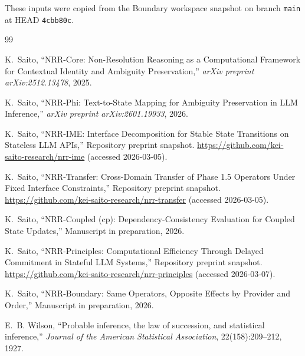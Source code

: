 \documentclass[11pt,a4paper]{article}
\begin{document}
These inputs were copied from the Boundary workspace snapshot on branch \texttt{main} at HEAD \texttt{4cbb80c}.

\begin{thebibliography}{99}
\raggedright

K.~Saito,
\newblock ``NRR-Core: Non-Resolution Reasoning as a Computational Framework for Contextual Identity and Ambiguity Preservation,''
\newblock \emph{arXiv preprint arXiv:2512.13478}, 2025.

K.~Saito,
\newblock ``NRR-Phi: Text-to-State Mapping for Ambiguity Preservation in LLM Inference,''
\newblock \emph{arXiv preprint arXiv:2601.19933}, 2026.

K.~Saito,
\newblock ``NRR-IME: Interface Decomposition for Stable State Transitions on Stateless LLM APIs,''
\newblock Repository preprint snapshot. \url{https://github.com/kei-saito-research/nrr-ime} (accessed 2026-03-05).

K.~Saito,
\newblock ``NRR-Transfer: Cross-Domain Transfer of Phase 1.5 Operators Under Fixed Interface Constraints,''
\newblock Repository preprint snapshot. \url{https://github.com/kei-saito-research/nrr-transfer} (accessed 2026-03-05).

K.~Saito,
\newblock ``NRR-Coupled (cp): Dependency-Consistency Evaluation for Coupled State Updates,''
\newblock Manuscript in preparation, 2026.

K.~Saito,
\newblock ``NRR-Principles: Computational Efficiency Through Delayed Commitment in Stateful LLM Systems,''
\newblock Repository preprint snapshot. \url{https://github.com/kei-saito-research/nrr-principles} (accessed 2026-03-07).

K.~Saito,
\newblock ``NRR-Boundary: Same Operators, Opposite Effects by Provider and Order,''
\newblock Manuscript in preparation, 2026.

E.~B. Wilson,
\newblock ``Probable inference, the law of succession, and statistical inference,''
\newblock \emph{Journal of the American Statistical Association}, 22(158):209--212, 1927.

\end{thebibliography}
\end{document}

